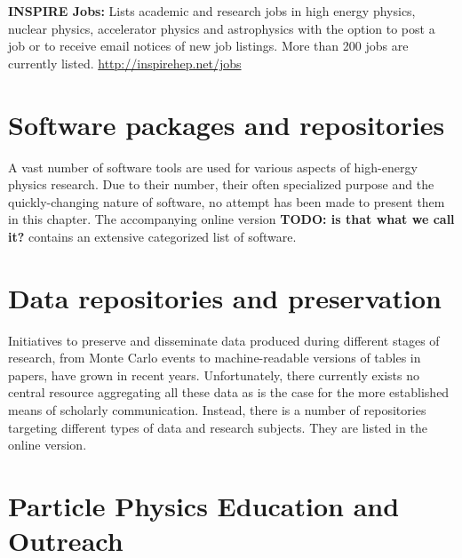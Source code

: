   \textbf{INSPIRE Jobs:} Lists academic and research jobs in high
  energy physics, nuclear physics, accelerator physics and astrophysics
  with the option to post a job or to receive email notices of new job
  listings. More than 200 jobs are currently listed.
  \url{http://inspirehep.net/jobs}

\section{Software packages and
repositories}\label{databases:sec:repositories}

A vast number of software tools are used for various aspects of high-energy
physics research. Due to their number, their often specialized purpose and the
quickly-changing nature of software, no attempt has been made to present them in this chapter.
The accompanying online version \textbf{TODO: is that what we call it?}
contains an extensive categorized list of software.

\section{Data repositories and preservation}\label{databases:sec:datarepositories}

Initiatives to preserve and disseminate data produced during different stages
of research, from Monte Carlo events to machine-readable versions of tables in
papers, have grown in recent years.  Unfortunately, there currently exists no
central resource aggregating all these data as is the case for the more
established means of scholarly communication. Instead, there is a number of
repositories targeting different types of data and research subjects. They are
listed in the online version.

\section{Particle Physics Education and Outreach
}\label{databases:sec:edusites}

